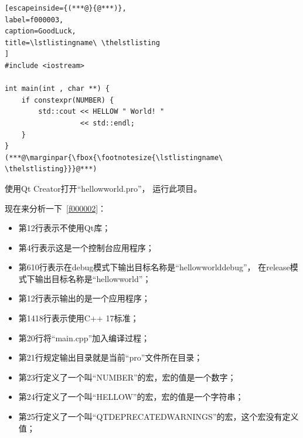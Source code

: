 \FloatBarrier
\begin{lstlisting}[escapeinside={(***@}{@***)},
label=f000003,
caption=GoodLuck,
title=\lstlistingname\ \thelstlisting
]
#include <iostream>

int main(int , char **) {
    if constexpr(NUMBER) {
        std::cout << HELLOW " World! "
                  << std::endl;
    }
}
(***@\marginpar{\fbox{\footnotesize{\lstlistingname\ \thelstlisting}}}@***)\end{lstlisting}          %


使用Qt Creator打开“hellow\underline{\hspace{0.5em}}world.pro”，
运行此项目。

现在来分析一下\lstlistingname\ \ref{f000002}：
\begin{itemize}
\item 第1\raisebox{0.16ex}{\sourcefonttwo\~{}}2行表示不使用Qt库；
\item 第4行表示这是一个控制台应用程序；
\item 第6\raisebox{0.16ex}{\sourcefonttwo\~{}}10行表示在debug模式下输出目标名称是“hellow\underline{\hspace{0.5em}}world\underline{\hspace{0.5em}}debug”，
在release模式下输出目标名称是“hellow\underline{\hspace{0.5em}}world”；
\item 第12行表示输出的是一个应用程序；
\item 第14\raisebox{0.16ex}{\sourcefonttwo\~{}}18行表示使用C{\sourcefonttwo{}+}{\sourcefonttwo{}+} 17标准；
\item 第20行将“main.cpp”加入编译过程；
\item 第21行规定输出目录就是当前“pro”文件所在目录；
\item 第23行定义了一个叫“NUMBER”的宏，宏的值是一个数字；
\item 第24行定义了一个叫“HELLOW”的宏，宏的值是一个字符串；
\item 第25行定义了一个叫“QT\underline{\hspace{0.5em}}DEPRECATED\underline{\hspace{0.5em}}WARNINGS”的宏，这个宏没有定义值；
\end{itemize}


